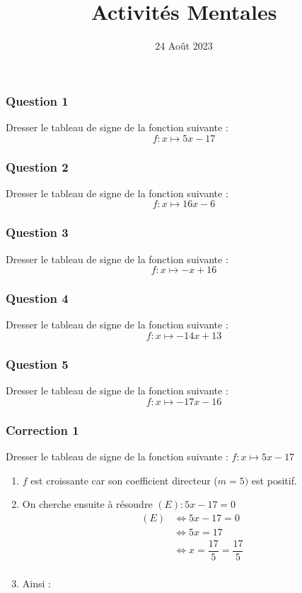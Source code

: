 \documentclass[15pt, mathserif]{beamer}
\title{Activités Mentales}
\date{24 Août 2023}
\begin{document}
\begin{frame}
    \titlepage
\end{frame}

\begin{frame} 
	\frametitle{Question 1}
Dresser le tableau de signe de la fonction suivante : $$ f:x\mapsto5x-17$$\end{frame}


\begin{frame} 
	\frametitle{Question 2}
Dresser le tableau de signe de la fonction suivante : $$ f:x\mapsto16x-6$$\end{frame}


\begin{frame} 
	\frametitle{Question 3}
Dresser le tableau de signe de la fonction suivante : $$ f:x\mapsto-x+16$$\end{frame}


\begin{frame} 
	\frametitle{Question 4}
Dresser le tableau de signe de la fonction suivante : $$ f:x\mapsto-14x+13$$\end{frame}


\begin{frame} 
	\frametitle{Question 5}
Dresser le tableau de signe de la fonction suivante : $$ f:x\mapsto-17x-16$$\end{frame}


\begin{frame}
\vspace{-10mm}
	\frametitle{Correction 1}
\vspace*{1cm} 
 \footnotesize{Dresser le tableau de signe de la fonction suivante : $ f:x\mapsto5x-17$} 
 \begin{enumerate} 
 \item $f$ est croissante car son coefficient directeur ($m=5)$ est positif.
 \item On cherche ensuite à résoudre  $(E) : 5x-17=0 $	 
 \begin{align*} (E)& \Leftrightarrow 5x-17=0\\
		 	 & \Leftrightarrow 5x=17\\
			 & \Leftrightarrow x= \dfrac{17}{5}=\dfrac{17}{5}\\
	 \end{align*} 
 \item Ainsi : \\ 
 \end{enumerate} 
 \end{frame}
\end{document}
